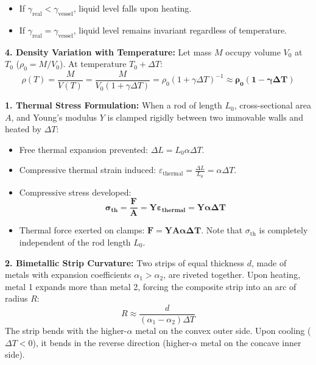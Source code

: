 \documentclass[10pt,twoside,openright]{book}
\begin{document}
\begin{formulabox}
\begin{itemize}
  \item If $\gamma_{\text{real}} < \gamma_{\text{vessel}}$, liquid level falls upon heating.
  \item If $\gamma_{\text{real}} = \gamma_{\text{vessel}}$, liquid level remains invariant regardless of temperature.
\end{itemize}
\textbf{4. Density Variation with Temperature:}
Let mass $M$ occupy volume $V_0$ at $T_0$ ($\rho_0 = M/V_0$). At temperature $T_0 + \Delta T$:
\begin{equation}
  \rho(T) = \frac{M}{V(T)} = \frac{M}{V_0(1 + \gamma\Delta T)} = \rho_0(1 + \gamma\Delta T)^{-1} \approx \mathbf{\rho_0(1 - \gamma\Delta T)}
\end{equation}
\end{formulabox}

\begin{usecasebox}
\textbf{1. Thermal Stress Formulation:}
When a rod of length $L_0$, cross-sectional area $A$, and Young's modulus $Y$ is clamped rigidly between two immovable walls and heated by $\Delta T$:
\begin{itemize}
  \item Free thermal expansion prevented: $\Delta L = L_0 \alpha \Delta T$.
  \item Compressive thermal strain induced: $\varepsilon_{\text{thermal}} = \frac{\Delta L}{L_0} = \alpha \Delta T$.
  \item Compressive stress developed:
  \begin{equation}
    \mathbf{\sigma_{\text{th}} = \frac{F}{A} = Y \varepsilon_{\text{thermal}} = Y \alpha \Delta T}
  \end{equation}
  \item Thermal force exerted on clamps: $\mathbf{F = Y A \alpha \Delta T}$. Note that $\sigma_{\text{th}}$ is completely independent of the rod length $L_0$.
\end{itemize}
\textbf{2. Bimetallic Strip Curvature:}
Two strips of equal thickness $d$, made of metals with expansion coefficients $\alpha_1 > \alpha_2$, are riveted together. Upon heating, metal 1 expands more than metal 2, forcing the composite strip into an arc of radius $R$:
\begin{equation}
  R \approx \frac{d}{(\alpha_1 - \alpha_2)\Delta T}
\end{equation}
The strip bends with the higher-$\alpha$ metal on the convex outer side. Upon cooling ($\Delta T < 0$), it bends in the reverse direction (higher-$\alpha$ metal on the concave inner side).
\end{usecasebox}
\end{document}
